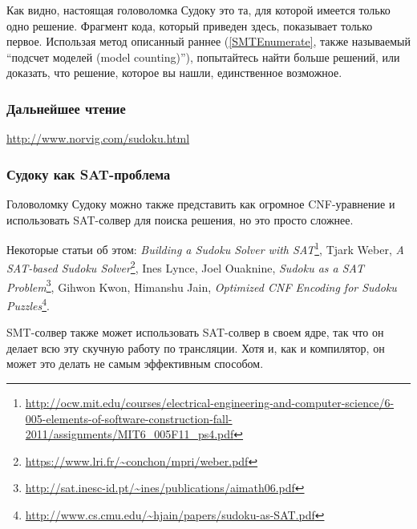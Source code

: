 Как видно, настоящая головоломка Судоку это та, для которой имеется только одно решение.
Фрагмент кода, который приведен здесь, показывает только первое.
Использая метод описанный раннее (\ref{SMTEnumerate}, также называемый ``подсчет моделей (model counting)''), 
попытайтесь найти больше решений, или доказать, что решение, которое вы нашли, единственное возможное.

\subsubsection{Дальнейшее чтение}

\url{http://www.norvig.com/sudoku.html}

\subsubsection{Судоку как \ac{SAT}-проблема}

Головоломку Судоку можно также представить как огромное \ac{CNF}-уравнение и использовать \ac{SAT}-солвер для поиска решения,
но это просто сложнее.

Некоторые статьи об этом:
\textit{Building a Sudoku Solver with SAT}\footnote{\url{http://ocw.mit.edu/courses/electrical-engineering-and-computer-science/6-005-elements-of-software-construction-fall-2011/assignments/MIT6_005F11_ps4.pdf}},
Tjark Weber, \textit{A SAT-based Sudoku Solver}\footnote{\url{https://www.lri.fr/~conchon/mpri/weber.pdf}},
Ines Lynce, Joel Ouaknine, \textit{Sudoku as a SAT Problem}\footnote{\url{http://sat.inesc-id.pt/~ines/publications/aimath06.pdf}},
Gihwon Kwon, Himanshu Jain, \textit{Optimized CNF Encoding for Sudoku Puzzles}\footnote{\url{http://www.cs.cmu.edu/~hjain/papers/sudoku-as-SAT.pdf}}.

\ac{SMT}-солвер также может использовать \ac{SAT}-солвер в своем ядре, так что он делает всю эту скучную работу
по трансляции.
Хотя и, как и компилятор, он может это делать не самым эффективным способом.

